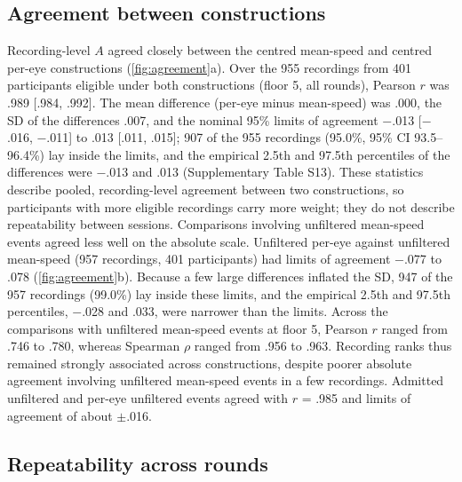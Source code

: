\subsection{Agreement between constructions}

Recording-level $A$ agreed closely between the centred mean-speed and centred per-eye constructions (\cref{fig:agreement}a). Over the 955 recordings from 401 participants eligible under both constructions (floor 5, all rounds), Pearson $r$ was .989 [.984, .992]. The mean difference (per-eye minus mean-speed) was .000, the SD of the differences .007, and the nominal 95\% limits of agreement $-$.013 [$-$.016, $-$.011] to .013 [.011, .015]; 907 of the 955 recordings (95.0\%, 95\% CI 93.5--96.4\%) lay inside the limits, and the empirical 2.5th and 97.5th percentiles of the differences were $-$.013 and .013 (Supplementary Table S13). These statistics describe pooled, recording-level agreement between two constructions, so participants with more eligible recordings carry more weight; they do not describe repeatability between sessions. Comparisons involving unfiltered mean-speed events agreed less well on the absolute scale. Unfiltered per-eye against unfiltered mean-speed (957 recordings, 401 participants) had limits of agreement $-$.077 to .078 (\cref{fig:agreement}b). Because a few large differences inflated the SD, 947 of the 957 recordings (99.0\%) lay inside these limits, and the empirical 2.5th and 97.5th percentiles, $-$.028 and .033, were narrower than the limits. Across the comparisons with unfiltered mean-speed events at floor 5, Pearson $r$ ranged from .746 to .780, whereas Spearman $\rho$ ranged from .956 to .963. Recording ranks thus remained strongly associated across constructions, despite poorer absolute agreement involving unfiltered mean-speed events in a few recordings. Admitted unfiltered and per-eye unfiltered events agreed with $r$ = .985 and limits of agreement of about $\pm$.016.



\subsection{Repeatability across rounds}

